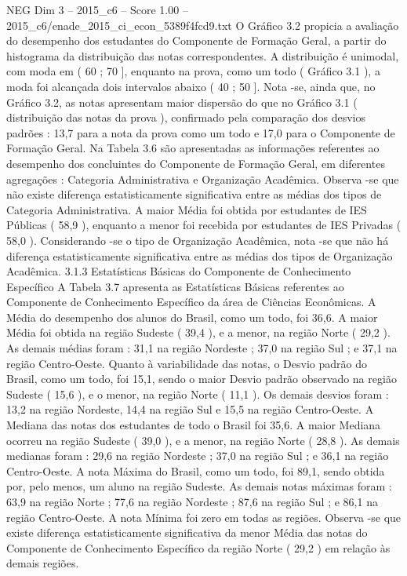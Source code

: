\begin{textsample}{NEG Dim 3 – 2015\_c6 – Score 1.00 – 2015\_c6/enade\_2015\_ci\_econ\_5389f4fcd9.txt}
O Gráfico 3.2 propicia a avaliação do desempenho dos estudantes do Componente de Formação Geral, a partir do histograma da distribuição das notas correspondentes.
A distribuição é unimodal, com moda em ( 60 ; 70 ], enquanto na prova, como um todo ( Gráfico 3.1 ), a moda foi alcançada dois intervalos abaixo ( 40 ; 50 ].
Nota -se, ainda que, no Gráfico 3.2, as notas apresentam maior dispersão do que no Gráfico 3.1 ( distribuição das notas da prova ), confirmado pela comparação dos desvios padrões : 13,7 para a nota da prova como um todo e 17,0 para o Componente de Formação Geral.
Na Tabela 3.6 são apresentadas as informações referentes ao desempenho dos concluintes do Componente de Formação Geral, em diferentes agregações : Categoria Administrativa e Organização Acadêmica.
Observa -se que não existe diferença estatisticamente significativa entre as médias dos tipos de Categoria Administrativa.
A maior Média foi obtida por estudantes de IES Públicas ( 58,9 ), enquanto a menor foi recebida por estudantes de IES Privadas ( 58,0 ).
Considerando -se o tipo de Organização Acadêmica, nota -se que não há diferença estatisticamente significativa entre as médias dos tipos de Organização Acadêmica. 3.1.3 Estatísticas Básicas do Componente de Conhecimento Específico A Tabela 3.7 apresenta as Estatísticas Básicas referentes ao Componente de Conhecimento Específico da área de Ciências Econômicas.
A Média do desempenho dos alunos do Brasil, como um todo, foi 36,6.
A maior Média foi obtida na região Sudeste ( 39,4 ), e a menor, na região Norte ( 29,2 ).
As demais médias foram : 31,1 na região Nordeste ; 37,0 na região Sul ; e 37,1 na região Centro-Oeste.
Quanto à variabilidade das notas, o Desvio padrão do Brasil, como um todo, foi 15,1, sendo o maior Desvio padrão observado na região Sudeste ( 15,6 ), e o menor, na região Norte ( 11,1 ).
Os demais desvios foram : 13,2 na região Nordeste, 14,4 na região Sul e 15,5 na região Centro-Oeste.
A Mediana das notas dos estudantes de todo o Brasil foi 35,6.
A maior Mediana ocorreu na região Sudeste ( 39,0 ), e a menor, na região Norte ( 28,8 ).
As demais medianas foram : 29,6 na região Nordeste ; 37,0 na região Sul ; e 36,1 na região Centro-Oeste.
A nota Máxima do Brasil, como um todo, foi 89,1, sendo obtida por, pelo menos, um aluno na região Sudeste.
As demais notas máximas foram : 63,9 na região Norte ; 77,6 na região Nordeste ; 87,6 na região Sul ; e 86,1 na região Centro-Oeste.
A nota Mínima foi zero em todas as regiões.
Observa -se que existe diferença estatisticamente significativa da menor Média das notas do Componente de Conhecimento Específico da região Norte ( 29,2 ) em relação às demais regiões.

\end{textsample}
